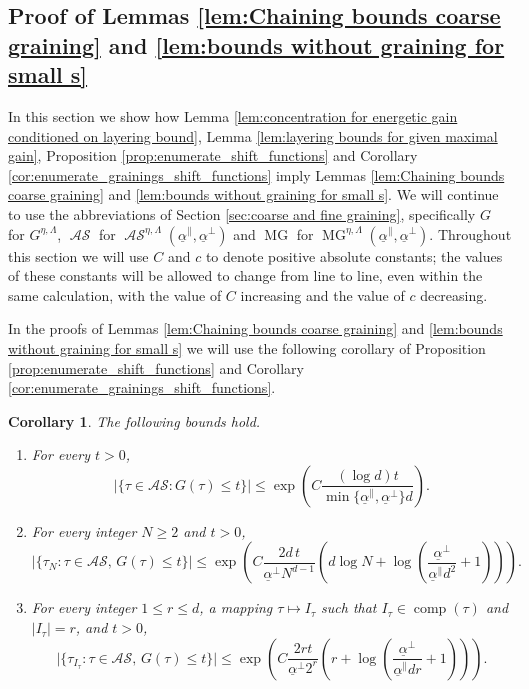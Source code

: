 \documentclass[11pt, reqno]{amsart}
\newtheorem{corollary}[theorem]{Corollary}
\DeclareMathOperator{\MG}{MG}
\DeclareMathOperator{\AS}{\mathcal{AS}}
\DeclareMathOperator{\comp}{comp}
\numberwithin{equation}{section}
\begin{document}
\subsection{Proof of Lemmas \ref{lem:Chaining bounds coarse graining} and \ref{lem:bounds without graining for small s}} 

In this section we show how Lemma \ref{lem:concentration for energetic gain conditioned on layering bound},
Lemma \ref{lem:layering bounds for given maximal gain}, Proposition \ref{prop:enumerate_shift_functions} and  Corollary \ref{cor:enumerate_grainings_shift_functions} imply Lemmas \ref{lem:Chaining bounds coarse graining} and \ref{lem:bounds without graining for small s}.
We will continue to use the abbreviations of Section \ref{sec:coarse and fine graining}, specifically $G$ for $G^{\eta,\Lambda}$, $\AS$ for $\AS^{\eta,\Lambda}(\underline{\alpha}^{\parallel},\underline{\alpha}^{\perp})$
and $\MG$ for $\MG^{\eta,\Lambda}(\underline{\alpha}^{\parallel},\underline{\alpha}^{\perp})$.
Throughout this section we will use $C$ and $c$ to denote positive absolute constants;
the values of these constants will be allowed to change from line to line, 
even within the same calculation, with the value of $C$ increasing and the value of $c$ decreasing.

In the proofs of Lemmas \ref{lem:Chaining bounds coarse graining} and \ref{lem:bounds without graining for small s} we will use the following corollary of Proposition \ref{prop:enumerate_shift_functions} and  Corollary \ref{cor:enumerate_grainings_shift_functions}. 
\begin{corollary}\label{cor:enumerate_adms}
The following bounds hold.
\begin{enumerate}
\item For every $t>0$,
\begin{equation}
\label{eq:enumerate_adms}
\lvert\{\tau\in\mathcal{AS}\colon G(\tau) \leq t\}\rvert\leq \exp\left(C\frac{(\log d)t}{\min\{\underline{\alpha}^{\parallel},\underline{\alpha}^{\perp}\} d}\right).
\end{equation}
\item For every integer $N\geq 2$ and $t>0$,
\begin{equation}
\label{eq:coarse_enumerate_adms}
\lvert \{\tau_{N}\colon\tau\in\mathcal{AS},\, G(\tau) \leq t \} \rvert \leq 
\exp \left( C \frac{2d\,t}{\underline{\alpha}^{\perp} N^{d-1}}  \left(d\log N +\log\left(\frac{\underline{\alpha}^{\perp}}{\underline{\alpha}^{\parallel}d^2}+1 \right)\right)\right).
\end{equation}
\item For every integer $1\le r\le d$, a mapping $\tau \mapsto I_{\tau}$ such that $I_{\tau}\in \comp(\tau)$ and $|I_{\tau}|=r$, and $t>0$,
\begin{equation}\label{eq:fine_enumerate_adms}
\lvert\{\tau_{I_\tau}\colon \tau\in\mathcal{AS},\,G(\tau) \leq t\}\rvert\leq 
\exp\left( C \frac{2r t}{ \underline{\alpha}^{\perp} 2^{r}} \left(r+\log\left(\frac{\underline{\alpha}^{\perp}}{ \underline{\alpha}^{\parallel}dr}+1 \right) \right) \right).
\end{equation}
\end{enumerate}
\end{corollary}
\end{document}
